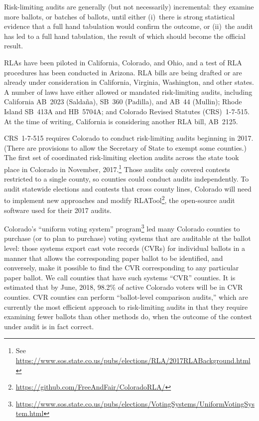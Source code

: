 \documentclass[runningheads]{llncs}
\begin{document}
Risk-limiting audits are generally (but not necessarily) incremental: they examine more ballots, or batches of ballots,
until either (i)~there is strong statistical evidence that a full hand tabulation would confirm the outcome,
or (ii)~the audit has led to a full hand tabulation, the result of which should become the official
result.

RLAs have been piloted in California, Colorado, and Ohio, and a test of
RLA procedures has been conducted in Arizona.
RLA bills are being drafted or are already under consideration in California,
Virginia, Washington, and other states.
A number of laws have either allowed or mandated risk-limiting audits,
including California AB~2023 (Salda\~{n}a), SB~360 (Padilla), and AB~44 (Mullin);
Rhode Island SB~413A and HB~5704A; and Colorado Revised Statutes (CRS)~1-7-515.
At the time of writing, California is considering another RLA bill, AB~2125.

CRS~1-7-515 requires 
Colorado to conduct risk-limiting audits beginning in 2017.
(There are provisions to allow the Secretary of State to exempt some counties.)
The first set of coordinated risk-limiting election audits across the state took place in Colorado in November, 2017.\footnote{%
 See \url{https://www.sos.state.co.us/pubs/elections/RLA/2017RLABackground.html}
}
Those audits only covered contests restricted to a single county,
so counties could conduct audits independently.
To audit statewide elections and contests that cross county lines, Colorado will need to implement new approaches
and modify RLATool\footnote{%
  \url{https://github.com/FreeAndFair/ColoradoRLA/}
}, 
the open-source audit software used for their 2017 audits. 

Colorado's ``uniform voting system'' program\footnote{%
  \url{https://www.sos.state.co.us/pubs/elections/VotingSystems/UniformVotingSystem.html}
} led
many Colorado counties to purchase (or to plan to purchase) voting systems
that are auditable at the ballot level: those systems export cast vote records (CVRs)
for individual ballots in a manner that allows the corresponding paper ballot to be identified,
and conversely, make it possible to find the CVR corresponding to any
particular paper ballot.
We call counties that have such systems ``CVR'' counties.
It is estimated that by June, 2018, 98.2\% of active Colorado voters will be in CVR counties.
CVR counties can perform ``ballot-level comparison audits,'' \cite{lindemanStark12} 
which are currently the
most efficient approach to risk-limiting audits in that they require examining
fewer ballots than other methods do, when the outcome of the contest under audit 
is in fact correct.
\end{document}
